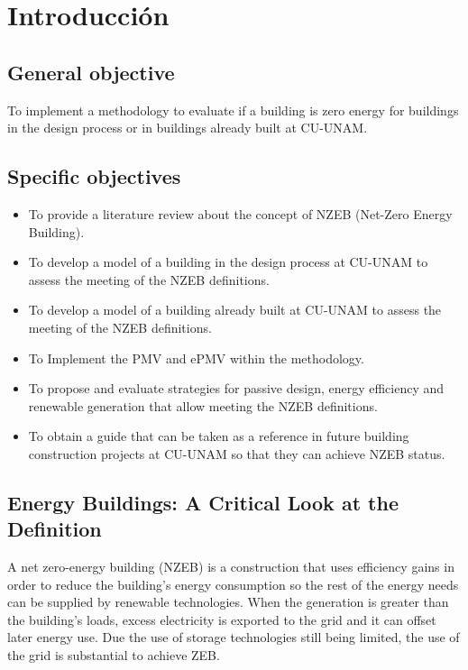 \chapter{Introducción}
\label{chap:introduccion}

\section{General objective}

To implement a methodology to evaluate if a building is zero energy for buildings in the design process or in buildings already built at CU-UNAM.


\section{Specific objectives}

\begin{itemize}

\item To provide a literature review about the concept of NZEB (Net-Zero Energy Building).

\item To develop a model of a building in the design process at CU-UNAM to assess the meeting of the NZEB definitions.

\item To develop a model of a building already built  at CU-UNAM to assess the meeting of the NZEB definitions.

\item To Implement the PMV and ePMV within the methodology.

\item To propose and evaluate strategies for passive design, energy efficiency and renewable generation that allow meeting the NZEB definitions.

\item To obtain a guide that can be taken as a reference in future building construction projects at CU-UNAM so that they can achieve NZEB status.

\end{itemize}


\section{Energy Buildings: A Critical Look at the Definition}

A net zero-energy building (NZEB) is a construction that uses efficiency gains in order to reduce the building's energy consumption so the rest of the energy needs can be supplied by renewable technologies. When the generation is greater than the building's loads, excess electricity is exported to the grid and it can offset later energy use. Due the use of storage technologies still being limited, the use of the grid is substantial to achieve ZEB.

